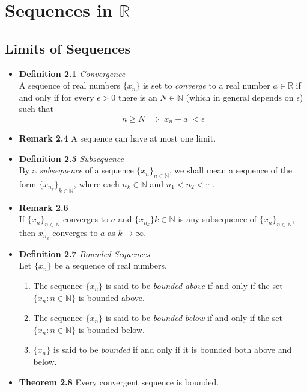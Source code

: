 \documentclass[11pt,a4paper]{article}
\begin{document}
\break{}

\section{Sequences in $\mathbb{R}$}

\subsection{Limits of Sequences}

\begin{itemize}
    \item \textbf{Definition 2.1} \emph{Convergence} \\
        A sequence of real numbers $\{ x_n \}$ is set to \emph{converge} to a real number
        $a \in \mathbb{R}$ if and only if for every $\epsilon > 0$ there is an
        $N \in \mathbb{N}$ (which in general depends on $\epsilon$) such that
        \[
            n \geq N \implies |x_n - a| < \epsilon
        \]
    \item \textbf{Remark 2.4}
        A sequence can have at most one limit.
    \item \textbf{Definition 2.5} \emph{Subsequence} \\
        By a \emph{subsequence} of a sequence ${\{x_n\}}_{n \in \mathbb{N}}$,
        we shall mean a sequence of the form ${\{x_{n_k}\}}_{k \in \mathbb{N}}$,
        where each $n_k \in \mathbb{N}$ and $n_1 < n_2 < \cdots$.
    \item \textbf{Remark 2.6} \\
        If ${ \{x_n\} }_{n \in \mathbb{N}}$ converges to $a$ and
        ${ \{x_n_k\} }{k \in \mathbb{N}}$ is any subsequence of
        ${ \{x_n\} }_{n \in \mathbb{N}}$, then $x_n_k$ converges to $a$ as $k \to \infty$.
    \item \textbf{Definition 2.7} \emph{Bounded Sequences} \\
        Let $\{ x_n \}$ be a sequence of real numbers.
        \begin{enumerate}
            \item The sequence $\{ x_n \}$ is said to be \emph{bounded above} if and only if
                the set $ \{ x_n : n \in \mathbb{N} \}$ is bounded above.
            \item The sequence $\{ x_n \}$ is said to be \emph{bounded below} if and only if
                the set $\{ x_n : n \in \mathbb{N} \}$ is bounded below.
            \item $\{ x_n \}$ is said to be \emph{bounded} if and only if it is bounded both
                above and below.
        \end{enumerate}
    \item \textbf{Theorem 2.8}
        Every convergent sequence is bounded.
\end{itemize}
\end{document}
